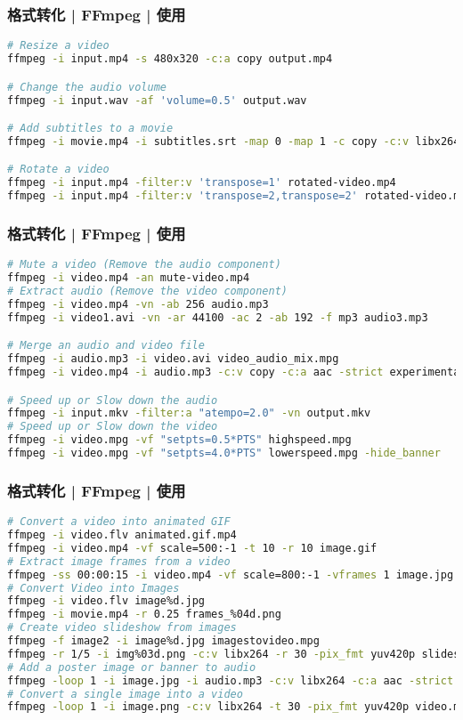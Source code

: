 \begin{frame}[fragile]
  \frametitle{格式转化 | FFmpeg | 使用}
\begin{lstlisting}[language=bash,basicstyle=\small\tt]
# Resize a video
ffmpeg -i input.mp4 -s 480x320 -c:a copy output.mp4

# Change the audio volume
ffmpeg -i input.wav -af 'volume=0.5' output.wav

# Add subtitles to a movie
ffmpeg -i movie.mp4 -i subtitles.srt -map 0 -map 1 -c copy -c:v libx264 -crf 23 -preset veryfast output.mkv

# Rotate a video
ffmpeg -i input.mp4 -filter:v 'transpose=1' rotated-video.mp4
ffmpeg -i input.mp4 -filter:v 'transpose=2,transpose=2' rotated-video.mp4
\end{lstlisting}
\end{frame}

\begin{frame}[fragile]
  \frametitle{格式转化 | FFmpeg | 使用}
\begin{lstlisting}[language=bash,basicstyle=\footnotesize\tt,numberstyle=\scriptsize]
# Mute a video (Remove the audio component)
ffmpeg -i video.mp4 -an mute-video.mp4
# Extract audio (Remove the video component)
ffmpeg -i video.mp4 -vn -ab 256 audio.mp3
ffmpeg -i video1.avi -vn -ar 44100 -ac 2 -ab 192 -f mp3 audio3.mp3

# Merge an audio and video file
ffmpeg -i audio.mp3 -i video.avi video_audio_mix.mpg
ffmpeg -i video.mp4 -i audio.mp3 -c:v copy -c:a aac -strict experimental output.mp4

# Speed up or Slow down the audio
ffmpeg -i input.mkv -filter:a "atempo=2.0" -vn output.mkv
# Speed up or Slow down the video
ffmpeg -i video.mpg -vf "setpts=0.5*PTS" highspeed.mpg
ffmpeg -i video.mpg -vf "setpts=4.0*PTS" lowerspeed.mpg -hide_banner
\end{lstlisting}
\end{frame}

\begin{frame}[fragile]
  \frametitle{格式转化 | FFmpeg | 使用}
\begin{lstlisting}[language=bash,basicstyle=\scriptsize\tt,numberstyle=\tiny]
# Convert a video into animated GIF
ffmpeg -i video.flv animated.gif.mp4
ffmpeg -i video.mp4 -vf scale=500:-1 -t 10 -r 10 image.gif
# Extract image frames from a video
ffmpeg -ss 00:00:15 -i video.mp4 -vf scale=800:-1 -vframes 1 image.jpg
# Convert Video into Images
ffmpeg -i video.flv image%d.jpg
ffmpeg -i movie.mp4 -r 0.25 frames_%04d.png
# Create video slideshow from images
ffmpeg -f image2 -i image%d.jpg imagestovideo.mpg
ffmpeg -r 1/5 -i img%03d.png -c:v libx264 -r 30 -pix_fmt yuv420p slideshow.mp4
# Add a poster image or banner to audio
ffmpeg -loop 1 -i image.jpg -i audio.mp3 -c:v libx264 -c:a aac -strict experimental -b:a 192k -shortest output.mp4
# Convert a single image into a video
ffmpeg -loop 1 -i image.png -c:v libx264 -t 30 -pix_fmt yuv420p video.mp4
\end{lstlisting}
\end{frame}

